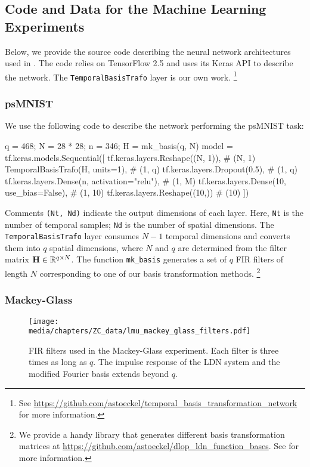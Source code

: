 \subsection{Code and Data for the Machine Learning Experiments}
\label{app:lmu_code}

Below, we provide the source code describing the neural network architectures used in .
The code relies on TensorFlow 2.5 \citep{abadi2016tensorflow} and uses its Keras API \citep{chollet2017deep} to describe the network.
The \texttt{TemporalBasisTrafo} layer is our own work.%
\footnote{See \url{https://github.com/astoeckel/temporal_basis_transformation_network} for more information.}

\subsubsection{psMNIST}

We use the following code to describe the network performing the psMNIST task:
\begin{pythoncode}
q = 468; N = 28 * 28; n = 346; H = mk_basis(q, N)
model = tf.keras.models.Sequential([
  tf.keras.layers.Reshape((N, 1)),             # (N, 1)
  TemporalBasisTrafo(H, units=1),              # (1, q)
  tf.keras.layers.Dropout(0.5),                # (1, q)
  tf.keras.layers.Dense(n, activation="relu"), # (1, M)
  tf.keras.layers.Dense(10, use_bias=False),   # (1, 10)
  tf.keras.layers.Reshape((10,))               # (10)
])
\end{pythoncode}
Comments \texttt{(Nt, Nd)} indicate the output dimensions of each layer.
Here, \texttt{Nt} is the number of temporal samples; \texttt{Nd} is the number of spatial dimensions.
The \texttt{TemporalBasisTrafo} layer consumes $N - 1$ temporal dimensions and converts them into $q$ spatial dimensions, where $N$ and $q$ are determined from the filter matrix $\mathbf{H} \in \mathbb{R}^{q \times N}$.
The function \texttt{mk\_basis} generates a set of $q$ FIR filters of length $N$ corresponding to one of our basis transformation methods.%
\footnote{We provide a handy library that generates different basis transformation matrices at \url{https://github.com/astoeckel/dlop_ldn_function_bases}. See \citet{stockel2021discrete} for more information.}

\subsubsection{Mackey-Glass}

\begin{figure}
	\texttt{[image: media/chapters/ZC\_data/lmu\_mackey\_glass\_filters.pdf]}
	\caption[FIR filters used in the Mackey-Glass experiment]{FIR filters used in the Mackey-Glass experiment. Each filter is three times as long as $q$. The impulse response of the LDN system and the modified Fourier basis extends beyond $q$.}
	\label{fig:lmu_mackey_glass_filters}
\end{figure}

